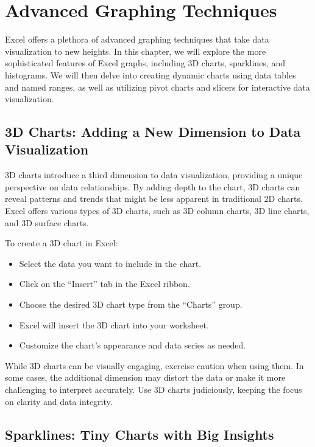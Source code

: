 \documentclass[
]{book}
\providecommand{\tightlist}{%
  \setlength{\itemsep}{0pt}\setlength{\parskip}{0pt}}
\begin{document}
\hypertarget{advanced-graphing-techniques}{%
\chapter{Advanced Graphing Techniques}\label{advanced-graphing-techniques}}

Excel offers a plethora of advanced graphing techniques that take data visualization to new heights. In this chapter, we will explore the more sophisticated features of Excel graphs, including 3D charts, sparklines, and histograms. We will then delve into creating dynamic charts using data tables and named ranges, as well as utilizing pivot charts and slicers for interactive data visualization.

\hypertarget{d-charts-adding-a-new-dimension-to-data-visualization}{%
\section{3D Charts: Adding a New Dimension to Data Visualization}\label{d-charts-adding-a-new-dimension-to-data-visualization}}

3D charts introduce a third dimension to data visualization, providing a unique perspective on data relationships. By adding depth to the chart, 3D charts can reveal patterns and trends that might be less apparent in traditional 2D charts. Excel offers various types of 3D charts, such as 3D column charts, 3D line charts, and 3D surface charts.

To create a 3D chart in Excel:

\begin{itemize}
\tightlist
\item
  Select the data you want to include in the chart.
\item
  Click on the ``Insert'' tab in the Excel ribbon.
\item
  Choose the desired 3D chart type from the ``Charts'' group.
\item
  Excel will insert the 3D chart into your worksheet.
\item
  Customize the chart's appearance and data series as needed.
\end{itemize}

While 3D charts can be visually engaging, exercise caution when using them. In some cases, the additional dimension may distort the data or make it more challenging to interpret accurately. Use 3D charts judiciously, keeping the focus on clarity and data integrity.

\hypertarget{sparklines-tiny-charts-with-big-insights}{%
\section{Sparklines: Tiny Charts with Big Insights}\label{sparklines-tiny-charts-with-big-insights}}
\end{document}
